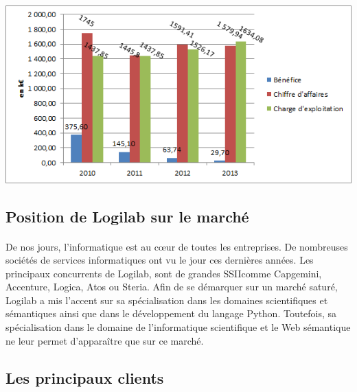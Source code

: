 \documentclass {report}
\begin{document}
\begin{center}
\includegraphics{compta.png}
\end{center}

\subsection{Position de Logilab sur le marché}
\paragraph{}
De nos jours, l'informatique est au cœur de toutes les entreprises. De nombreuses sociétés de services informatiques ont vu le jour ces dernières années. Les principaux concurrents de Logilab, sont de grandes SSII\footnotemark[3] comme Capgemini, Accenture, Logica, Atos ou Steria. Afin de se démarquer sur un marché saturé, Logilab a mis l'accent sur sa spécialisation dans les domaines scientifiques et sémantiques ainsi que dans le développement du langage Python. Toutefois, sa spécialisation dans le domaine de l'informatique scientifique et le Web sémantique ne leur permet d'apparaître que sur ce marché.



\subsection{Les principaux clients}
\end{document}
